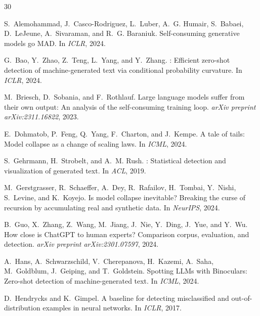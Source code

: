\documentclass[11pt]{article}
\begin{document}
\begin{thebibliography}{30}

S.~Alemohammad, J.~Casco-Rodriguez, L.~Luber, A.~G. Humair, S.~Babaei, D.~LeJeune, A.~Sivaraman, and R.~G. Baraniuk.
\newblock Self-consuming generative models go {MAD}.
\newblock In \emph{ICLR}, 2024.

G.~Bao, Y.~Zhao, Z.~Teng, L.~Yang, and Y.~Zhang.
: Efficient zero-shot detection of machine-generated text via conditional probability curvature.
\newblock In \emph{ICLR}, 2024.

M.~Briesch, D.~Sobania, and F.~Rothlauf.
\newblock Large language models suffer from their own output: An analysis of the self-consuming training loop.
\newblock \emph{arXiv preprint arXiv:2311.16822}, 2023.

E.~Dohmatob, P.~Feng, Q.~Yang, F.~Charton, and J.~Kempe.
\newblock A tale of tails: Model collapse as a change of scaling laws.
\newblock In \emph{ICML}, 2024.

S.~Gehrmann, H.~Strobelt, and A.~M. Rush.
: Statistical detection and visualization of generated text.
\newblock In \emph{ACL}, 2019.

M.~Gerstgrasser, R.~Schaeffer, A.~Dey, R.~Rafailov, H.~Tombai, Y.~Nishi, S.~Levine, and K.~Koyejo.
\newblock Is model collapse inevitable? {Breaking} the curse of recursion by accumulating real and synthetic data.
\newblock In \emph{NeurIPS}, 2024.

B.~Guo, X.~Zhang, Z.~Wang, M.~Jiang, J.~Nie, Y.~Ding, J.~Yue, and Y.~Wu.
\newblock How close is {ChatGPT} to human experts? {Comparison} corpus, evaluation, and detection.
\newblock \emph{arXiv preprint arXiv:2301.07597}, 2024.

A.~Hans, A.~Schwarzschild, V.~Cherepanova, H.~Kazemi, A.~Saha, M.~Goldblum, J.~Geiping, and T.~Goldstein.
\newblock Spotting {LLMs} with {Binoculars}: Zero-shot detection of machine-generated text.
\newblock In \emph{ICML}, 2024.

D.~Hendrycks and K.~Gimpel.
\newblock A baseline for detecting misclassified and out-of-distribution examples in neural networks.
\newblock In \emph{ICLR}, 2017.


\end{thebibliography}
\end{document}
